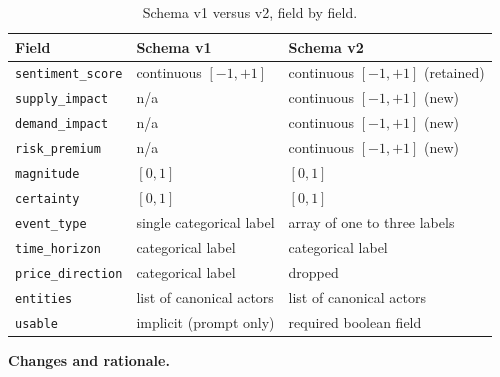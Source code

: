 \begin{table}[h]
  \centering
  \small
  \caption{Schema v1 versus v2, field by field.}
  \label{tab:schema-comparison}
  \begin{tabular}{@{}lll@{}}
    \toprule
    Field & Schema v1 & Schema v2 \\
    \midrule
    \texttt{sentiment\_score} & continuous $[-1, +1]$ & continuous $[-1, +1]$ (retained) \\
    \texttt{supply\_impact} & n/a & continuous $[-1, +1]$ (new) \\
    \texttt{demand\_impact} & n/a & continuous $[-1, +1]$ (new) \\
    \texttt{risk\_premium} & n/a & continuous $[-1, +1]$ (new) \\
    \texttt{magnitude} & $[0, 1]$ & $[0, 1]$ \\
    \texttt{certainty} & $[0, 1]$ & $[0, 1]$ \\
    \texttt{event\_type} & single categorical label & array of one to three labels \\
    \texttt{time\_horizon} & categorical label & categorical label \\
    \texttt{price\_direction} & categorical label & dropped \\
    \texttt{entities} & list of canonical actors & list of canonical actors \\
    \texttt{usable} & implicit (prompt only) & required boolean field \\
    \bottomrule
  \end{tabular}
\end{table}

\textbf{Changes and rationale.}

